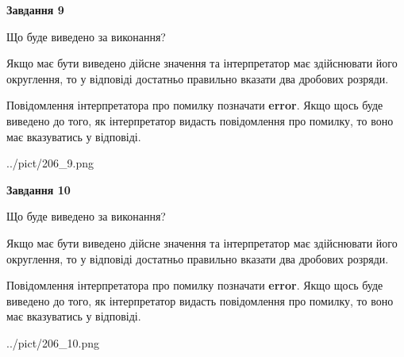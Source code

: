 \documentclass[12pt, ukrainian]{article}
\begin{document}
{\begin {Large}
{\begin {center}\textbf{Завдання 9}\end {center}}\par
Що буде виведено за виконання? \par

Якщо має бути виведено дійсне значення та інтерпретатор має здійснювати його округлення, 
то у відповіді достатньо правильно вказати два дробових розряди.

Повідомлення інтерпретатора про помилку позначати \textbf{error}.
Якщо щось буде виведено до того, як інтерпретатор видасть повідомлення про помилку, 
то воно має вказуватись у відповіді. \par

\begin{center}
	{../pict/206_9.png}
\end{center}
\newpage

{\begin {center}\textbf{Завдання 10}\end {center}}\par
Що буде виведено за виконання? \par

Якщо має бути виведено дійсне значення та інтерпретатор має здійснювати його округлення, 
то у відповіді достатньо правильно вказати два дробових розряди.

Повідомлення інтерпретатора про помилку позначати \textbf{error}.
Якщо щось буде виведено до того, як інтерпретатор видасть повідомлення про помилку, 
то воно має вказуватись у відповіді. \par

\begin{center}
	{../pict/206_10.png}
\end{center}
\newpage

\end {Large}}
\end{document}
